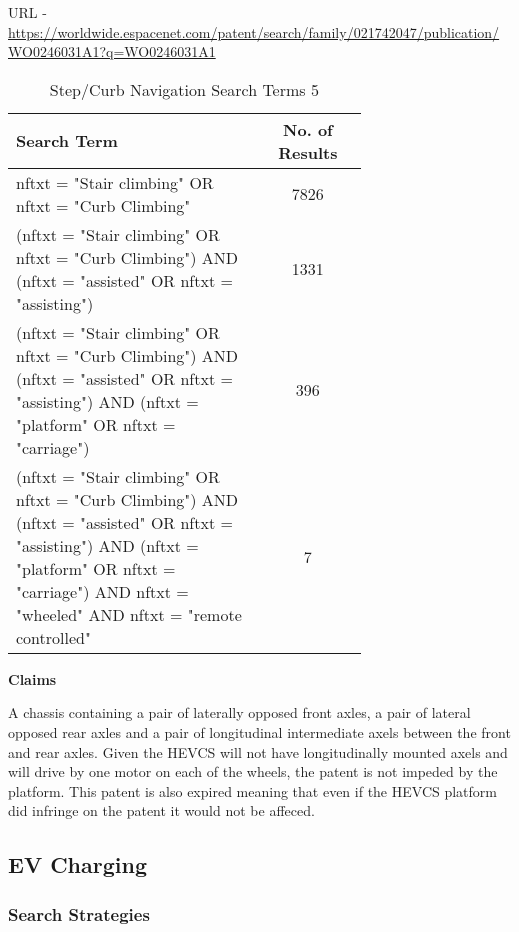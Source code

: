 \documentclass [12pt]{article}
\begin{document}
URL - \url{https://worldwide.espacenet.com/patent/search/family/021742047/publication/WO0246031A1?q=WO0246031A1}

\begin{table}[H]
    \centering
    \setlength{\arrayrulewidth}{1.5pt}
    \begin{tabular}{|p{0.7\linewidth}|c|}
    \hline
    \cellcolor{gray!40}Search Term & \cellcolor{gray!40}No. of Results \\
    \hline
    nftxt = "Stair climbing" OR nftxt = "Curb Climbing" & 7826 \\
    \hline
    (nftxt = "Stair climbing" OR nftxt = "Curb Climbing") AND (nftxt = "assisted" OR nftxt = "assisting") & 1331 \\
    \hline
    (nftxt = "Stair climbing" OR nftxt = "Curb Climbing") AND (nftxt = "assisted" OR nftxt = "assisting") AND (nftxt = "platform" OR nftxt = "carriage") & 396 \\
    \hline
    (nftxt = "Stair climbing" OR nftxt = "Curb Climbing") AND (nftxt = "assisted" OR nftxt = "assisting") AND (nftxt = "platform" OR nftxt = "carriage") AND nftxt = "wheeled" AND nftxt = "remote controlled"& 7 \\
    \hline
    \end{tabular}
    \caption{Step/Curb Navigation Search Terms 5}
    \label{table:step_curb_nav_st_5}
\end{table}

\textbf{Claims}

A chassis containing a pair of laterally opposed front axles, a pair of lateral opposed rear axles and a pair of longitudinal intermediate axels between the front and rear axles.
Given the HEVCS will not have longitudinally mounted axels and will drive by one motor on each of the wheels, the patent is not impeded by the platform.
This patent is also expired meaning that even if the HEVCS platform did infringe on the patent it would not be affeced.



\subsection{EV Charging}\label{sec:ev_charging}

\cite{Home_Chargepoints}

\subsubsection{Search Strategies}\label{sec:EV_Charging_Search_Term}
\end{document}
